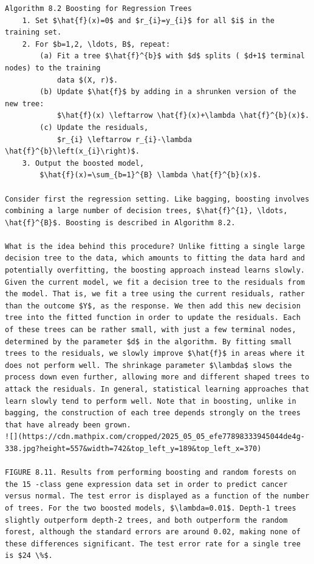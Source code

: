 \documentclass[10pt]{article}
\begin{document}
\begin{verbatim}
Algorithm 8.2 Boosting for Regression Trees
    1. Set $\hat{f}(x)=0$ and $r_{i}=y_{i}$ for all $i$ in the training set.
    2. For $b=1,2, \ldots, B$, repeat:
        (a) Fit a tree $\hat{f}^{b}$ with $d$ splits ( $d+1$ terminal nodes) to the training
            data $(X, r)$.
        (b) Update $\hat{f}$ by adding in a shrunken version of the new tree:
            $\hat{f}(x) \leftarrow \hat{f}(x)+\lambda \hat{f}^{b}(x)$.
        (c) Update the residuals,
            $r_{i} \leftarrow r_{i}-\lambda \hat{f}^{b}\left(x_{i}\right)$.
    3. Output the boosted model,
        $\hat{f}(x)=\sum_{b=1}^{B} \lambda \hat{f}^{b}(x)$.

Consider first the regression setting. Like bagging, boosting involves combining a large number of decision trees, $\hat{f}^{1}, \ldots, \hat{f}^{B}$. Boosting is described in Algorithm 8.2.

What is the idea behind this procedure? Unlike fitting a single large decision tree to the data, which amounts to fitting the data hard and potentially overfitting, the boosting approach instead learns slowly. Given the current model, we fit a decision tree to the residuals from the model. That is, we fit a tree using the current residuals, rather than the outcome $Y$, as the response. We then add this new decision tree into the fitted function in order to update the residuals. Each of these trees can be rather small, with just a few terminal nodes, determined by the parameter $d$ in the algorithm. By fitting small trees to the residuals, we slowly improve $\hat{f}$ in areas where it does not perform well. The shrinkage parameter $\lambda$ slows the process down even further, allowing more and different shaped trees to attack the residuals. In general, statistical learning approaches that learn slowly tend to perform well. Note that in boosting, unlike in bagging, the construction of each tree depends strongly on the trees that have already been grown.
![](https://cdn.mathpix.com/cropped/2025_05_05_efe77898333945044de4g-338.jpg?height=557&width=742&top_left_y=189&top_left_x=370)

FIGURE 8.11. Results from performing boosting and random forests on the 15 -class gene expression data set in order to predict cancer versus normal. The test error is displayed as a function of the number of trees. For the two boosted models, $\lambda=0.01$. Depth-1 trees slightly outperform depth-2 trees, and both outperform the random forest, although the standard errors are around 0.02, making none of these differences significant. The test error rate for a single tree is $24 \%$.


\end{verbatim}
\end{document}
